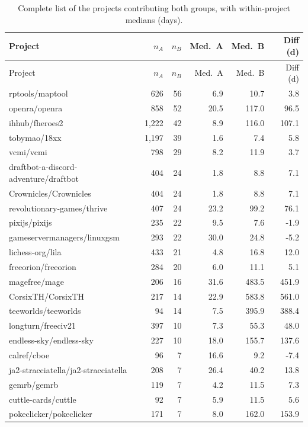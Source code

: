 \begin{center}
{\footnotesize
\begin{longtable}{@{}lrrrrr@{}}
\caption{Complete list of the \valnProjBoth{} projects contributing both groups, with within-project medians (days).}\label{tab:projects-all}\\
\toprule
Project & $n_A$ & $n_B$ & Med.\ A & Med.\ B & Diff (d) \\
\midrule
\endfirsthead
\toprule
Project & $n_A$ & $n_B$ & Med.\ A & Med.\ B & Diff (d) \\
\midrule
\endhead
rptools/maptool & 626 & 56 & 6.9 & 10.7 & 3.8 \\
openra/openra & 858 & 52 & 20.5 & 117.0 & 96.5 \\
ihhub/fheroes2 & 1,222 & 42 & 8.9 & 116.0 & 107.1 \\
tobymao/18xx & 1,197 & 39 & 1.6 & 7.4 & 5.8 \\
vcmi/vcmi & 798 & 29 & 8.2 & 11.9 & 3.7 \\
draftbot-a-discord-adventure/draftbot & 404 & 24 & 1.8 & 8.8 & 7.1 \\
Crownicles/Crownicles & 404 & 24 & 1.8 & 8.8 & 7.1 \\
revolutionary-games/thrive & 407 & 24 & 23.2 & 99.2 & 76.1 \\
pixijs/pixijs & 235 & 22 & 9.5 & 7.6 & -1.9 \\
gameservermanagers/linuxgsm & 293 & 22 & 30.0 & 24.8 & -5.2 \\
lichess-org/lila & 433 & 21 & 4.8 & 16.8 & 12.0 \\
freeorion/freeorion & 284 & 20 & 6.0 & 11.1 & 5.1 \\
magefree/mage & 206 & 16 & 31.6 & 483.5 & 451.9 \\
CorsixTH/CorsixTH & 217 & 14 & 22.9 & 583.8 & 561.0 \\
teeworlds/teeworlds & 94 & 14 & 7.5 & 395.9 & 388.4 \\
longturn/freeciv21 & 397 & 10 & 7.3 & 55.3 & 48.0 \\
endless-sky/endless-sky & 227 & 10 & 18.0 & 155.7 & 137.6 \\
calref/cboe & 96 & 7 & 16.6 & 9.2 & -7.4 \\
ja2-stracciatella/ja2-stracciatella & 208 & 7 & 26.4 & 40.2 & 13.8 \\
gemrb/gemrb & 119 & 7 & 4.2 & 11.5 & 7.3 \\
cuttle-cards/cuttle & 92 & 7 & 5.9 & 11.5 & 5.6 \\
pokeclicker/pokeclicker & 171 & 7 & 8.0 & 162.0 & 153.9 \\

\end{longtable}}
\end{center}
